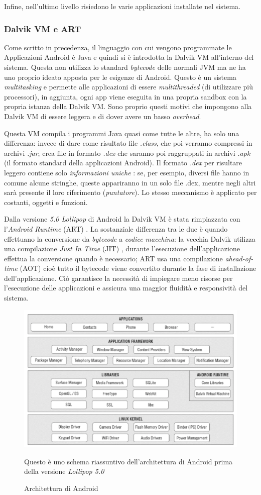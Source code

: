 Infine, nell'ultimo livello risiedono le varie applicazioni installate nel sistema.

\subsubsection{Dalvik VM e ART}
Come scritto in precedenza, il linguaggio con cui vengono programmate le Applicazioni Android è Java e quindi si è introdotta la Dalvik VM all'interno del sistema. Questa non utilizza lo standard \textit{bytecode} delle normali JVM ma ne ha uno proprio ideato apposta per le esigenze di Android. Questo è un sistema \textit{multitasking} e permette alle applicazioni di essere \textit{multithreaded} (di utilizzare più processori), in aggiunta, ogni app viene eseguita in una propria sandbox con la propria istanza della Dalvik VM. Sono proprio questi motivi che impongono alla Dalvik VM di essere leggera e di dover avere un basso \textit{overhead}.

Questa VM compila i programmi Java quasi come tutte le altre, ha solo una differenza: invece di dare come risultato file \textit{.class}, che poi verranno compressi in archivi \textit{.jar}, crea file in formato \textit{.dex} che saranno poi raggruppati in archivi \textit{.apk} (il formato standard della applicazioni Android). Il formato \textit{.dex} per risultare leggero contiene solo \textit{informazioni uniche} \cite{androiden}: se, per esempio, diversi file hanno in comune alcune stringhe, queste appariranno in un solo file .dex, mentre negli altri sarà presente il loro riferimento (\textit{puntatore}). Lo stesso meccanismo è applicato per costanti, oggetti e funzioni.

Dalla versione \textit{5.0 Lollipop} di Android la Dalvik VM è stata rimpiazzata con l'\textit{Android Runtime} (ART) \cite{androiden}. La sostanziale differenza tra le due è quando effettuano la conversione da \textit{bytecode} a \textit{codice macchina}: la vecchia Dalvik utilizza una compilazione \textit{Just In Time} (JIT) \cite{androidwikipedia}, durante l'esecuzione dell'applicazione effettua la conversione quando è necessario; ART usa una compilazione \textit{ahead-of-time} (AOT) \cite{androidwikipedia} cioè tutto il bytecode viene convertito durante la fase di installazione dell'applicazione. Ciò garantisce la necessità di impiegare meno risorse per l'esecuzione delle applicazioni e assicura una maggior fluidità e responsività del sistema. 

\begin{figure}[H]
  \includegraphics[scale=0.62]{android/imgs/os_architecture.png}
  \caption{Architettura di Android}
  Questo è uno schema riassuntivo dell'architettura di Android prima della versione \textit{Lollipop 5.0}
\end{figure}